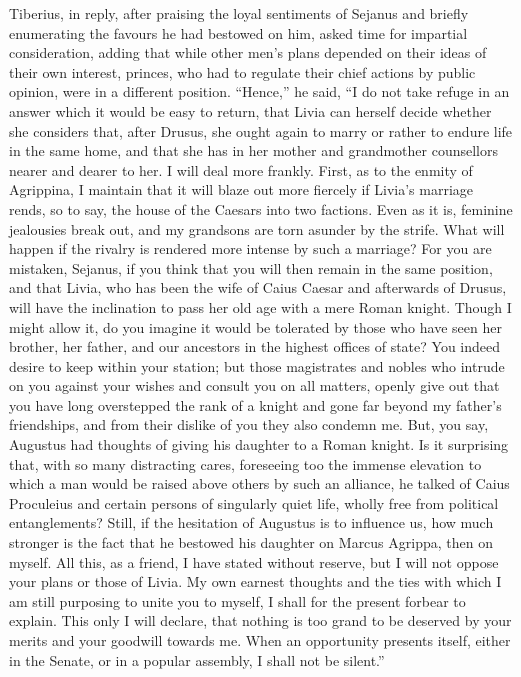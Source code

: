 Tiberius, in reply, after praising the loyal sentiments of Sejanus and briefly enumerating the favours he had bestowed on him, asked time for impartial consideration, adding that while other men's plans depended on their ideas of their own interest, princes, who had to regulate their chief actions by public opinion, were in a different position. ``Hence,'' he said, ``I do not take refuge in an answer which it would be easy to return, that Livia can herself decide whether she considers that, after Drusus, she ought again to marry or rather to endure life in the same home, and that she has in her mother and grandmother counsellors nearer and dearer to her. I will deal more frankly. First, as to the enmity of Agrippina, I maintain that it will blaze out more fiercely if Livia's marriage rends, so to say, the house of the Caesars into two factions. Even as it is, feminine jealousies break out, and my grandsons are torn asunder by the strife. What will happen if the rivalry is rendered more intense by such a marriage? For you are mistaken, Sejanus, if you think that you will then remain in the same position, and that Livia, who has been the wife of Caius Caesar and afterwards of Drusus, will have the inclination to pass her old age with a mere Roman knight. Though I might allow it, do you imagine it would be tolerated by those who have seen her brother, her father, and our ancestors in the highest offices of state? You indeed desire to keep within your station; but those magistrates and nobles who intrude on you against your wishes and consult you on all matters, openly give out that you have long overstepped the rank of a knight and gone far beyond my father's friendships, and from their dislike of you they also condemn me. But, you say, Augustus had thoughts of giving his daughter to a Roman knight. Is it surprising that, with so many distracting cares, foreseeing too the immense elevation to which a man would be raised above others by such an alliance, he talked of Caius Proculeius and certain persons of singularly quiet life, wholly free from political entanglements? Still, if the hesitation of Augustus is to influence us, how much stronger is the fact that he bestowed his daughter on Marcus Agrippa, then on myself. All this, as a friend, I have stated without reserve, but I will not oppose your plans or those of Livia. My own earnest thoughts and the ties with which I am still purposing to unite you to myself, I shall for the present forbear to explain. This only I will declare, that nothing is too grand to be deserved by your merits and your goodwill towards me. When an opportunity presents itself, either in the Senate, or in a popular assembly, I shall not be silent.''

